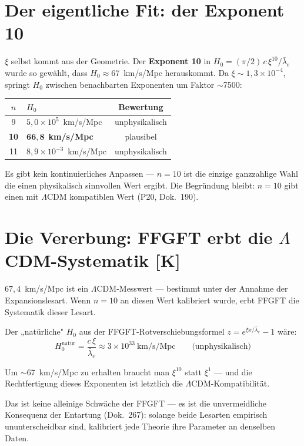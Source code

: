 \section{Der eigentliche Fit: der Exponent 10}

$\xi$ selbst kommt aus der Geometrie. Der \textbf{Exponent 10} in
$H_0 = (\pi/2)\,c\,\xi^{10}/\bar\lambda_e$ wurde so gewählt, dass
$H_0 \approx 67$~km/s/Mpc herauskommt. Da $\xi \sim 1{,}3\times10^{-4}$,
springt $H_0$ zwischen benachbarten Exponenten um Faktor $\sim$7500:

\begin{center}
\begin{tabular}{clc}
\toprule
$n$ & $H_0$ & Bewertung \\
\midrule
9  & $5{,}0\times10^5$~km/s/Mpc & unphysikalisch \\
\textbf{10} & $\mathbf{66{,}8}$~\textbf{km/s/Mpc} & plausibel \\
11 & $8{,}9\times10^{-3}$~km/s/Mpc & unphysikalisch \\
\bottomrule
\end{tabular}
\end{center}

Es gibt kein kontinuierliches Anpassen — $n=10$ ist die einzige
ganzzahlige Wahl die einen physikalisch sinnvollen Wert ergibt.
Die Begründung bleibt: $n=10$ gibt einen mit $\Lambda$CDM
kompatiblen Wert (P20, Dok.~190).

\section{Die Vererbung: FFGFT erbt die $\Lambda$CDM-Systematik [K]}

$67{,}4$~km/s/Mpc ist ein $\Lambda$CDM-Messwert — bestimmt unter
der Annahme der Expansionslesart. Wenn $n=10$ an diesen Wert
kalibriert wurde, erbt FFGFT die Systematik dieser Lesart.

Der „natürliche" $H_0$ aus der FFGFT-Rotverschiebungsformel
$z = e^{\xi x/\bar\lambda_e} - 1$ wäre:
\[
  H_0^\text{natur} = \frac{c\,\xi}{\bar\lambda_e}
  \approx 3\times10^{33}~\text{km/s/Mpc}
  \qquad\text{(unphysikalisch)}
\]

Um $\sim$67~km/s/Mpc zu erhalten braucht man $\xi^{10}$ statt $\xi^1$ —
und die Rechtfertigung dieses Exponenten ist letztlich die
$\Lambda$CDM-Kompatibilität.

Das ist keine alleinige Schwäche der FFGFT — es ist die unvermeidliche
Konsequenz der Entartung (Dok.~267): solange beide Lesarten empirisch
ununterscheidbar sind, kalibriert jede Theorie ihre Parameter an
denselben Daten.

